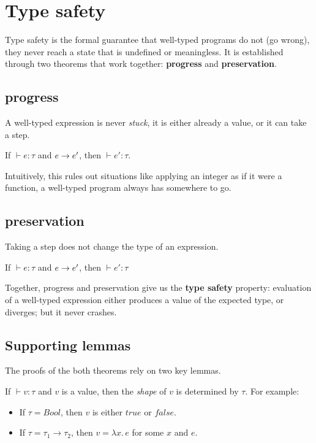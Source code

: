 \section{Type safety}
Type safety is the formal guarantee that well-typed programs do not (go wrong), they never reach a state that is undefined or meaningless. It is established through two theorems that work together: \textbf{progress} and \textbf{preservation}.

\subsection{progress}
A well-typed expression is never \emph{stuck}, it is either already a value, or it can take a step.
\begin{theorem}[progress]
If $\vdash e : \tau$ and $e \rightarrow e'$, then $\vdash e' : \tau$.
\end{theorem}

Intuitively, this rules out situations like applying an integer as if it were a function, a well-typed program always has somewhere to go.

\subsection{preservation}
Taking a step does not change the type of an expression.

\begin{theorem}[preservation]
If $\vdash e : \tau$ and $e \rightarrow e'$, then $\vdash e' : \tau$
\end{theorem}

Together, progress and preservation give us the \textbf{type safety} property: evaluation of a well-typed expression either produces a value of the expected type, or diverges; but it never crashes.

\subsection{Supporting lemmas}
The proofs of the both theorems rely on two key lemmas.
\begin{lemma}[Canonicity]
If $\vdash v : \tau$ and $v$ is a value, then the \emph{shape} of $v$
is determined by $\tau$. For example:
\begin{itemize}
    \item If $\tau = \mathit{Bool}$, then $v$ is either $\mathit{true}$
    or $\mathit{false}$.
    \item If $\tau = \tau_1 \to \tau_2$, then $v = \lambda x.\, e$ for
    some $x$ and $e$.
\end{itemize}
\end{lemma}

